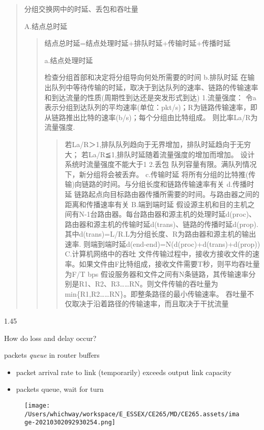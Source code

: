 \documentclass[
]{article}
\begin{document}
\begin{quote}
分组交换网中的时延、丢包和吞吐量

A.结点总时延

\begin{quote}
结点总时延=结点处理时延+排队时延+传输时延+传播时延

a.结点处理时延

检查分组首部和决定将分组导向何处所需要的时间 b.排队时延
在输出队列中等待传输的时延，取决于到达队列的速率、链路的传输速率和到达流量的性质(周期性到达还是突发形式到达)
1.流量强度：
令a表示分组到达队列的平均速率(单位：pkt/s)；R为链路传输速率，即从链路推出比特的速率(b/s)；每个分组由比特组成。
则比率La/R为流量强度.

\begin{quote}
若La/R＞1,排队队列趋向于无界增加，排队时延趋向于无穷大；
若La/R≦1,排队时延随着流量强度的增加而增加。 设计系统时流量强度不能大于1
2.丢包 队列容量有限。满队列情况下，新分组将会被丢弃。 c.传输时延
将所有分组的比特推(传输)向链路的时间。与分组长度和链路传输速率有关
d.传播时延
链路起点向目标路由器传播所需要的时间。与路由器之间的距离和传播速率有关
B.端到端时延
假设源主机和目的主机之间有N-1台路由器。每台路由器和源主机的处理时延d(proc)、路由器和源主机的传输时延d(trans)、链路的传播时延d(prop).其中d(trans)=L/R.L为分组长度、R为路由器和源主机的输出速率.
则端到端时延d(end-end)=N(d(proc)+d(trans)+d(prop)) C.计算机网络中的吞吐
文件传输过程中，接收方接收文件的速率。如果文件由F比特组成，接收文件需要T秒，则平均吞吐量为F/T
bps
假设服务器和文件之间有N条链路，其传输速率分别是R1、R2、R3\ldots\ldots RN。则文件传输的吞吐量为min\{R1,R2\ldots\ldots RN\}。即整条路径的最小传输速率。
吞吐量不仅取决于沿着路径的传输速率，而且取决于干扰流量
\end{quote}
\end{quote}
\end{quote}

1.45

How do loss and delay occur?

packets \emph{queue} in router buffers

\begin{itemize}
\item
  packet arrival rate to link (temporarily) exceeds output link capacity
\item
  packets queue, wait for turn
\end{itemize}

\begin{figure}
\centering
\texttt{[image: /Users/whichway/workspace/E\_ESSEX/CE265/MD/CE265.assets/image-20210302092930254.png]}
\caption{}
\end{figure}
\end{document}
